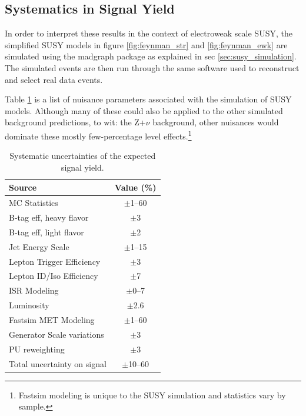   \subsection{Systematics in Signal Yield} \label{sec:systematics_in_signal_yield}
    In order to interpret these results in the context of electroweak scale SUSY, the simplified SUSY models in figure \ref{fig:feynman_str} and \ref{fig:feynman_ewk} are simulated using the madgraph package as explained in sec \ref{sec:susy_simulation}. The simulated events are then run through the same software used to reconstruct and select real data events. 

    Table \ref{tab:syst} is a list of nuisance parameters associated with the simulation of SUSY models. Although many of these could also be applied to the other simulated background predictions, to wit: the Z+$\nu$ background, other nuisances would dominate these mostly few-percentage level effects.\footnote{Fastsim \MET modeling is unique to the SUSY simulation and statistics vary by sample.} 

    \begin{table}[htb]
      \begin{center}
        \footnotesize
        \caption{\label{tab:syst} Systematic uncertainties of the expected signal yield. }
        \begin{tabular}{l|c}
          \hline
          \hline
          Source                     & Value (\%) \\
          \hline
          MC Statistics              & $\pm$1--60 \\
          B-tag eff, heavy flavor    & $\pm$3    \\
          B-tag eff, light flavor    & $\pm$2    \\
          Jet Energy Scale           & $\pm$1--15  \\
          Lepton Trigger Efficiency  & $\pm$3    \\
          Lepton ID/Iso Efficiency   & $\pm$7    \\
          ISR Modeling               & $\pm$0--7  \\
          Luminosity \cite{Lumi_unc} & $\pm$2.6  \\
          Fastsim MET Modeling       & $\pm$1--60    \\
          Generator Scale variations & $\pm$3   \\
          PU reweighting             & $\pm$3    \\
          \hline
          Total uncertainty on signal& $\pm$10--60 \\
          \hline
          \hline
        \end{tabular}
      \end{center}
    \end{table}

